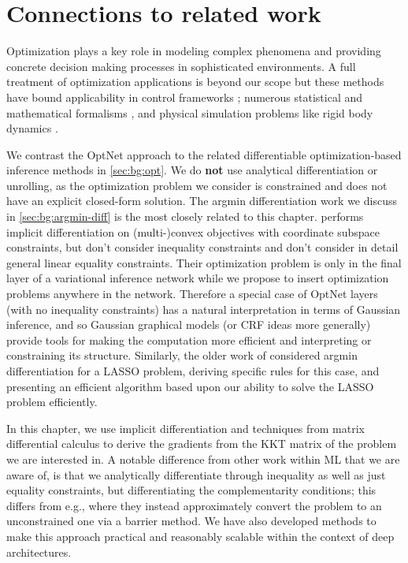 \section{Connections to related work}
Optimization plays a key role in modeling complex phenomena and providing
concrete decision making processes in sophisticated environments.
A full treatment of optimization applications is beyond our scope
\citep{boyd2004convex} but these methods have bound applicability in
control frameworks \citep{morari1999model,sastry2011adaptive};
numerous statistical and mathematical formalisms
\citep{sra2012optimization}, and physical simulation problems like
rigid body dynamics \citep{lotstedt1984numerical}.

We contrast the OptNet approach to the related
differentiable optimization-based inference methods
in \cref{sec:bg:opt}.
We do \textbf{not} use analytical differentiation or unrolling,
as the optimization problem we consider is constrained and
does not have an explicit closed-form solution.
The argmin differentiation work we discuss in
\cref{sec:bg:argmin-diff} is the most closely related
to this chapter.
\citet{johnson2016composing} performs implicit differentiation on
(multi-)convex objectives with coordinate subspace constraints,
but don't consider inequality constraints and don't consider in
detail general linear equality constraints.
Their optimization problem is only in the final layer of a
variational inference network while we propose to insert optimization
problems anywhere in the network.
Therefore a special case of OptNet layers (with no inequality constraints)
has a natural interpretation in terms of Gaussian inference,
and so Gaussian graphical models (or CRF ideas more generally)
provide tools for making the computation more efficient and interpreting
or constraining its structure.
Similarly, the older work of \citet{mairal2012task} considered argmin
differentiation for a LASSO problem, deriving specific rules for this case, and
presenting an efficient algorithm based upon our ability to solve the LASSO
problem efficiently.

In this chapter, we use implicit differentiation
\citep{dontchev2009implicit,griewank2008evaluating}
and techniques from matrix differential calculus \citep{magnus1988matrix}
to derive the gradients from the KKT matrix of the problem
we are interested in.
A notable difference from other work within ML that we are
aware of, is that we analytically differentiate through inequality as well as
just equality constraints, but differentiating the complementarity conditions;
this differs from e.g., \citet{gould2016differentiating} where they instead
approximately convert the problem to an unconstrained one via a barrier method.
We have also developed methods to make this approach practical and reasonably
scalable within the context of deep architectures.

